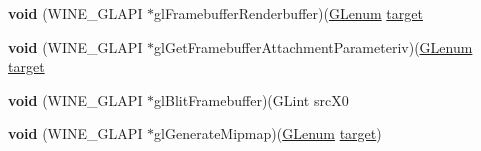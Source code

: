 \begin{DoxyCompactItemize}
\item 
\mbox{\label{structwined3d__fbo__ops_a5c62e26a32699843a671951e548d2599}} 
{\bfseries void} (W\+I\+N\+E\+\_\+\+G\+L\+A\+PI $\ast$gl\+Framebuffer\+Renderbuffer)(\hyperlink{interfacevoid}{G\+Lenum} \hyperlink{interfacevoid}{target}
\item 
\mbox{\label{structwined3d__fbo__ops_a3264aa331ac39d6f29afbca9a731c026}} 
{\bfseries void} (W\+I\+N\+E\+\_\+\+G\+L\+A\+PI $\ast$gl\+Get\+Framebuffer\+Attachment\+Parameteriv)(\hyperlink{interfacevoid}{G\+Lenum} \hyperlink{interfacevoid}{target}
\item 
\mbox{\label{structwined3d__fbo__ops_acdccf5e14e1a398e951eb3c9408ba23e}} 
{\bfseries void} (W\+I\+N\+E\+\_\+\+G\+L\+A\+PI $\ast$gl\+Blit\+Framebuffer)(G\+Lint src\+X0
\item 
\mbox{\label{structwined3d__fbo__ops_a8e98c8f5c072020f5fa87ba31c034ff1}} 
{\bfseries void} (W\+I\+N\+E\+\_\+\+G\+L\+A\+PI $\ast$gl\+Generate\+Mipmap)(\hyperlink{interfacevoid}{G\+Lenum} \hyperlink{interfacevoid}{target})
\end{DoxyCompactItemize}
